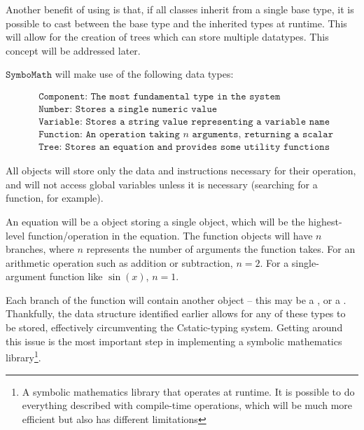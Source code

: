 \documentclass[12pt]{article}
\def\CC{{C\nolinebreak[4]\hspace{-.05em}\raisebox{.4ex}{\tiny\bf ++ }}}
\def\Symbo{{$\texttt{SymboMath}$}}
\begin{document}
Another benefit of using  is that, if all classes inherit from a single base type, it is possible to cast between the base type and the inherited types at runtime. This will allow for the creation of trees which can store multiple datatypes. This concept will be addressed later.

\vspace{1cm}

\Symbo{} will make use of the following data types:

\begin{align*}
&\texttt{Component: The most fundamental type in the system}
\\
&\texttt{Number: Stores a single numeric value}
\\
&\texttt{Variable: Stores a string value representing a variable name}
\\
&\texttt{Function: An operation taking $n$ arguments, returning a scalar}
\\
&\texttt{Tree: Stores an equation and provides some utility functions}
\end{align*}

\vspace{1cm}

All objects will store only the data and instructions necessary for their operation, and will not access global variables unless it is necessary (searching for a function, for example).

An equation will be a  object storing a single  object, which will be the highest-level function/operation in the equation. The function objects will have $n$ branches, where $n$ represents the number of arguments the function takes. For an arithmetic operation such as addition or subtraction, $n=2$. For a single-argument function like $\sin(x)$, $n=1$.

Each branch of the function will contain another object -- this may be a ,  or a . Thankfully, the data structure identified earlier allows for any of these types to be stored, effectively circumventing the \CC static-typing system. Getting around this issue is the most important step in implementing a symbolic mathematics library\footnote{A symbolic mathematics library that operates at runtime. It is possible to do everything described with compile-time operations, which will be much more efficient but also has different limitations}.
\end{document}

